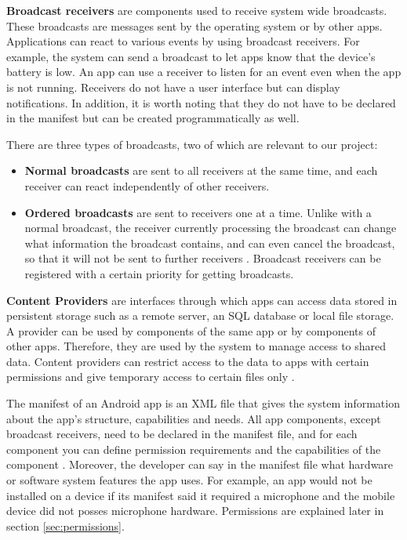     \textbf{Broadcast receivers} are components used to receive system wide broadcasts. These broadcasts are messages sent by the operating system or by other apps. Applications can react to various events by using broadcast receivers. For example, the system can send a broadcast to let apps know that the device’s battery is low. An app can use a receiver to listen for an event even when the app is not running. Receivers do not have a user interface but can display notifications. In addition, it is worth noting that they do not have to be declared in the manifest but can be created programmatically as well. 
    
    There are three types of broadcasts, two of which are relevant to our project:
    \begin{itemize}[noitemsep]
        \item \textbf{Normal broadcasts} are sent to all receivers at the same time, and each receiver can react independently of other receivers.
        \item \textbf{Ordered broadcasts} are sent to receivers one at a time. Unlike with a normal broadcast, the receiver currently processing the broadcast can change what information the broadcast contains, and can even cancel the broadcast, so that it will not be sent to further receivers \cite{broadcasts_overview}. Broadcast receivers can be registered with a certain priority for getting broadcasts.
    \end{itemize}
        
    \textbf{Content Providers} are interfaces through which apps can access data stored in persistent storage such as a remote server, an SQL database or local file storage. A provider can be used by components of the same app or by components of other apps. Therefore, they are used by the system to manage access to shared data. Content providers can restrict access to the data to apps with certain permissions and give temporary access to certain files only \cite{android_app_fundamentals}.
    
    The manifest of an Android app is an XML file that gives the system information about the app’s structure, capabilities and needs. All app components, except broadcast receivers, need to be declared in the manifest file, and for each component you can define permission requirements and the capabilities of the component \cite{android_app_fundamentals}. Moreover, the developer can say in the manifest file what hardware or software system features the app uses. For example, an app would not be installed on a device if its manifest said it required a microphone and the mobile device did not posses microphone hardware. Permissions are explained later in section \ref{sec:permissions}.
    
